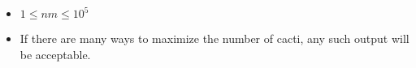 \begin{itemize}
\tightlist
\item $1 \le nm \le 10^5$
\item If there are many ways to maximize the number of cacti, any such output
      will be acceptable.
\end{itemize}
\newpage

